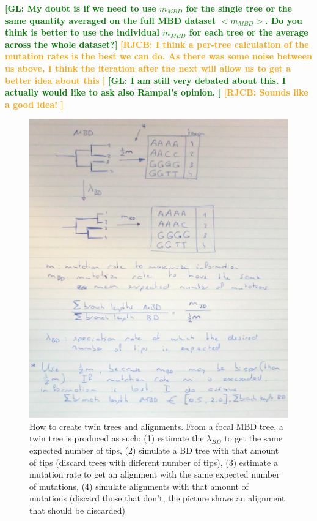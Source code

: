 \documentclass{article}
\newcommand*\richel[1]{\textcolor{orange}{\textbf{[RJCB: #1]}}}
\newcommand*\gio[1]{\textcolor{green}{\textbf{[GL: #1]}}}
\begin{document}
\begin{itemize}
\gio{My doubt is if we need to use $m_{MBD}$ for the single tree or the same
quantity averaged on the full MBD dataset $<m_{MBD}>$.
Do you think is better to use the
individual $m_{MBD}$ for each tree or the average across the whole
dataset?}
\richel{
  I think a per-tree calculation of the mutation rates 
  is the best we can do. As there was some noise between us above,
  I think the iteration after the next will allow us to get a better
  idea about this
}
\gio{
  I am still very debated about this. I actually would like to ask also Rampal's opinion.
}
\richel{
  Sounds like a good idea!
}

\begin{figure}[!htbp]
  \includegraphics[width=\textwidth]{mbd.jpg}
  \caption{
    How to create twin trees and alignments. From a focal MBD tree, a twin tree is produced as 
    such: (1) estimate the $\lambda_{BD}$ to get the same expected number of tips, (2) simulate a BD tree with that amount of tips (discard trees with different number of tips), (3) estimate a mutation rate to get an alignment with the same expected number of mutations, (4) simulate alignments with that amount of mutations (discard those that don't, the picture shows an alignment that should be discarded) 
  }
\end{figure}


\end{itemize}
\end{document}

